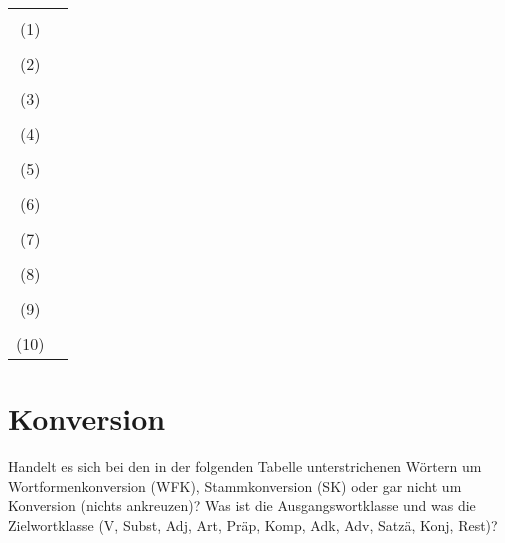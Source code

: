 \documentclass[12pt,a4paper,twoside]{article}
\begin{document}
\newpage

\begin{center}
  \begin{tabular}[h]{cp{}}
    &\\
    (1) & \\\cline{2-2}
    &\\
    (2) & \\\cline{2-2}
    &\\
    (3) & \\\cline{2-2}
    &\\
    (4) & \\\cline{2-2}
    &\\
    (5) & \\\cline{2-2}
    &\\
    (6) & \\\cline{2-2}
    &\\
    (7) & \\\cline{2-2}
    &\\
    (8) & \\\cline{2-2}
    &\\
    (9) & \\\cline{2-2}
    &\\
    (10) & \\\cline{2-2}
  \end{tabular}
\end{center}


\section{Konversion}


Handelt es sich bei den in der folgenden Tabelle unterstrichenen Wörtern um Wortformenkonversion (WFK), Stammkonversion (SK) oder gar nicht um Konversion (nichts ankreuzen)?
Was ist die Ausgangswortklasse und was die Zielwortklasse (V, Subst, Adj, Art, Präp, Komp, Adk, Adv, Satzä, Konj, Rest)?
\end{document}
